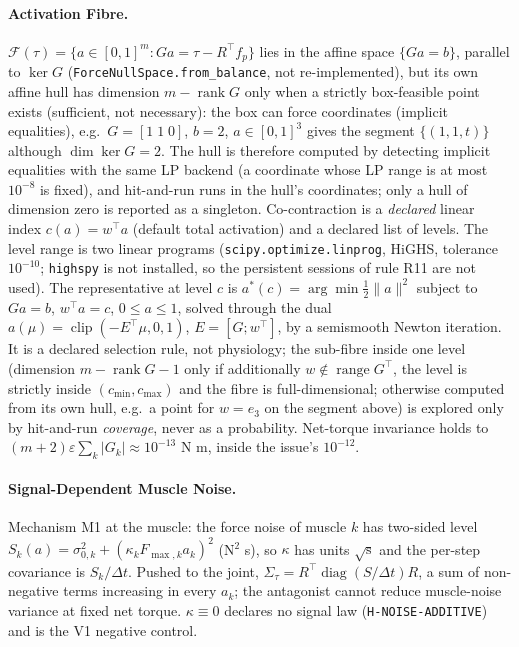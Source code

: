 \documentclass[11pt,a4paper]{article}
\begin{document}
\paragraph{Activation Fibre.}  $\mathcal{F}(\tau)=\{a\in[0,1]^m: Ga=\tau-R^{\top}f_p\}$
lies in the affine space $\{Ga=b\}$, parallel to $\ker G$
(\texttt{ForceNullSpace.from\_balance}, not re-implemented), but its own affine
hull has dimension $m-\operatorname{rank}G$ only when a strictly box-feasible
point exists (sufficient, not necessary): the box can force coordinates
(implicit equalities), e.g.\ $G=[1\;1\;0]$, $b=2$, $a\in[0,1]^3$ gives the
segment $\{(1,1,t)\}$ although $\dim\ker G=2$.  The hull is therefore computed
by detecting implicit equalities with the same LP backend (a coordinate whose LP
range is at most $10^{-8}$ is fixed), and hit-and-run runs in the hull's
coordinates; only a hull of dimension zero is reported as a singleton.
Co-contraction is a \emph{declared} linear index
$c(a)=w^{\top}a$ (default total activation) and a declared list of levels.  The
level range is two linear programs (\texttt{scipy.optimize.linprog}, HiGHS,
tolerance $10^{-10}$; \texttt{highspy} is not installed, so the persistent
sessions of rule R11 are not used).  The representative at level $c$ is
$a^*(c)=\arg\min\tfrac12\lVert a\rVert^2$ subject to $Ga=b$, $w^{\top}a=c$,
$0\le a\le1$, solved through the dual $a(\mu)=\operatorname{clip}(-E^{\top}\mu,0,1)$,
$E=[G;w^{\top}]$, by a semismooth Newton iteration.  It is a declared selection
rule, not physiology; the sub-fibre inside one level (dimension
$m-\operatorname{rank}G-1$ only if additionally $w\notin\operatorname{range}G^{\top}$,
the level is strictly inside $(c_{\min},c_{\max})$ and the fibre is
full-dimensional; otherwise computed from its own hull, e.g.\ a point for
$w=e_3$ on the segment above) is explored only by hit-and-run \emph{coverage}, never as a
probability.  Net-torque invariance holds to
$(m+2)\varepsilon\sum_k\lvert G_k\rvert\approx10^{-13}$ N m, inside the issue's
$10^{-12}$.

\paragraph{Signal-Dependent Muscle Noise.}  Mechanism M1 at the muscle: the
force noise of muscle $k$ has two-sided level
$S_k(a)=\sigma_{0,k}^2+(\kappa_kF_{\max,k}a_k)^2$ (N$^2$ s), so $\kappa$ has
units $\sqrt{\mathrm{s}}$ and the per-step covariance is $S_k/\Delta t$.
Pushed to the joint, $\Sigma_\tau=R^{\top}\operatorname{diag}(S/\Delta t)R$, a
sum of non-negative terms increasing in every $a_k$; the antagonist cannot
reduce muscle-noise variance at fixed net torque.  $\kappa\equiv0$ declares no
signal law (\texttt{H-NOISE-ADDITIVE}) and is the V1 negative control.
\end{document}
